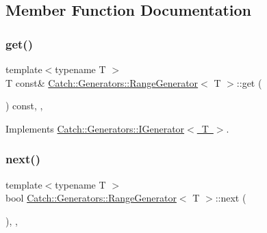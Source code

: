 \subsection{Member Function Documentation}
\mbox{\label{class_catch_1_1_generators_1_1_range_generator_a2639173bb9f06ba353314cd226fcefec}} 
\subsubsection{\texorpdfstring{get()}{get()}}
{\footnotesize\ttfamily template$<$typename T $>$ \\
T const\& \mbox{\hyperlink{class_catch_1_1_generators_1_1_range_generator}{Catch\+::\+Generators\+::\+Range\+Generator}}$<$ T $>$\+::get (\begin{DoxyParamCaption}{ }\end{DoxyParamCaption}) const\hspace{0.3cm}{\ttfamily [inline]}, {\ttfamily [override]}, {\ttfamily [virtual]}}



Implements \mbox{\hyperlink{struct_catch_1_1_generators_1_1_i_generator_a525d381fc9249a885b075a0632a8579a}{Catch\+::\+Generators\+::\+I\+Generator$<$ T $>$}}.

\mbox{\label{class_catch_1_1_generators_1_1_range_generator_a4e6b2038832f09724d5a4355b4691259}} 
\subsubsection{\texorpdfstring{next()}{next()}}
{\footnotesize\ttfamily template$<$typename T $>$ \\
bool \mbox{\hyperlink{class_catch_1_1_generators_1_1_range_generator}{Catch\+::\+Generators\+::\+Range\+Generator}}$<$ T $>$\+::next (\begin{DoxyParamCaption}{ }\end{DoxyParamCaption})\hspace{0.3cm}{\ttfamily [inline]}, {\ttfamily [override]}, {\ttfamily [virtual]}}



